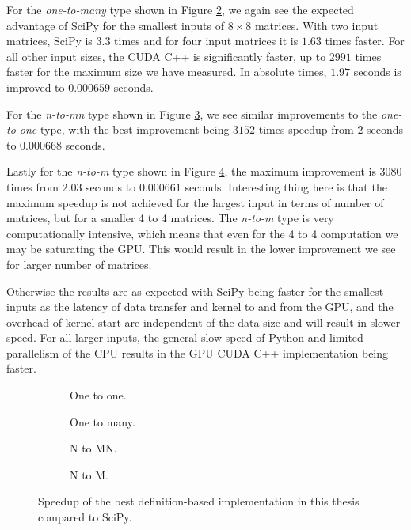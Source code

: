 For the \textit{one-to-many} type shown in Figure \ref{fig:scipy_one_to_many_gpulab}, we again see the expected advantage of SciPy for the smallest inputs of $8 \times 8$ matrices. With two input matrices, SciPy is $3.3$ times and for four input matrices it is $1.63$ times faster. For all other input sizes, the CUDA C++ is significantly faster, up to $2991$ times faster for the maximum size we have measured. In absolute times, $1.97$ seconds is improved to $0.000659$ seconds.

For the \textit{n-to-mn} type shown in Figure \ref{fig:scipy_n_to_mn_gpulab}, we see similar improvements to the \textit{one-to-one} type, with the best improvement being $3152$ times speedup from $2$ seconds to $0.000668$ seconds.

Lastly for the \textit{n-to-m} type shown in Figure \ref{fig:scipy_n_to_m_gpulab}, the maximum improvement is $3080$ times from $2.03$ seconds to $0.000661$ seconds. Interesting thing here is that the maximum speedup is not achieved for the largest input in terms of number of matrices, but for a smaller 4 to 4 matrices. The \textit{n-to-m} type is very computationally intensive, which means that even for the 4 to 4 computation we may be saturating the GPU. This would result in the lower improvement we see for larger number of matrices.

Otherwise the results are as expected with SciPy being faster for the smallest inputs as the latency of data transfer and kernel to and from the GPU, and the overhead of kernel start are independent of the data size and will result in slower speed. For all larger inputs, the general slow speed of Python and limited parallelism of the CPU results in the GPU CUDA C++ implementation being faster.


\begin{figure}[ht]
	\centering	
	\begin{subfigure}{0.35\textwidth}
		\centering
		\def\svgwidth{\textwidth}
		
		\caption{One to one.}
		\label{fig:scipy_one_to_one_gpulab}
	\end{subfigure}
	\begin{subfigure}{0.35\textwidth}
		\centering
		\def\svgwidth{\textwidth}
		
		\caption{One to many.}
		\label{fig:scipy_one_to_many_gpulab}
	\end{subfigure}
	\begin{subfigure}{0.35\textwidth}
		\centering
		\def\svgwidth{\textwidth}
		
		\caption{N to MN.}
		\label{fig:scipy_n_to_mn_gpulab}
	\end{subfigure}
	\begin{subfigure}{0.35\textwidth}
		\centering
		\def\svgwidth{\textwidth}
		
		\caption{N to M.}
		\label{fig:scipy_n_to_m_gpulab}
	\end{subfigure}
	\caption{Speedup of the best definition-based implementation in this thesis compared to SciPy.}
	\label{fig:scipy_speedup}
\end{figure}

